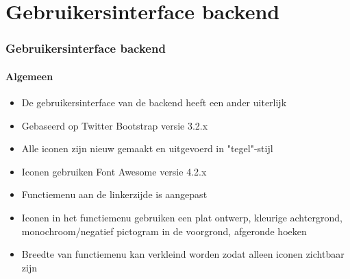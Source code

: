 %

\section{Gebruikersinterface backend}


\begin{frame}[fragile]
	\frametitle{Gebruikersinterface backend}
	\framesubtitle{Algemeen}

	\begin{itemize}
		\item De gebruikersinterface van de backend heeft een ander uiterlijk
		\item Gebaseerd op Twitter Bootstrap versie 3.2.x
		\item Alle iconen zijn nieuw gemaakt en uitgevoerd in "tegel"-stijl
		\item Iconen gebruiken Font Awesome versie 4.2.x
		\item Functiemenu aan de linkerzijde is aangepast
		\item Iconen in het functiemenu gebruiken een plat ontwerp, kleurige achtergrond,
			monochroom/negatief pictogram in de voorgrond, afgeronde hoeken
		\item Breedte van functiemenu kan verkleind worden zodat alleen iconen zichtbaar zijn

	\end{itemize}

\end{frame}

